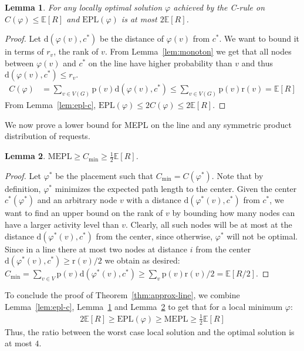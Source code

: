\documentclass[conference]{IEEEtran}
\def\E{\mathbb{E}}
\def\d{\mathrm{d}}
\def\p{\mathrm{p}}
\def\r{\mathrm{r}}
\def\epl{\mathrm{EPL}}
\def\mepl{\mathrm{MEPL}}
\newtheorem{lemma}{Lemma}
\begin{document}
\begin{lemma}\label{lemma:upper_bound_line}
For any locally optimal solution $\varphi$ achieved by the C-rule on $C(\varphi) \le \E[R]$ and $\epl(\varphi)$ is at most $2\E[R]$.
\end{lemma}
\begin{proof}
Let $\d(\varphi(v),c^*)$ be the distance of $\varphi(v)$ from $c^*$. We want to bound it in terms of $r_v$, the rank of $v$.
From Lemma~\ref{lem:monoton} we get that all nodes between $\varphi(v)$ and $c^*$ on the line have higher probability than $v$ and thus $\d(\varphi(v),c^*) \le r_v$.
\begin{align*}
C(\varphi)&=\sum_{v\in V(G)}\p(v)\d(\varphi(v),c^*)\le \sum_{v \in V(G)} \p(v) \r(v)=\E[R]
\end{align*}
From Lemma~\ref{lem:epl-c}, $\epl(\varphi) \le 2C(\varphi) \le 2\E[R]$.
\end{proof}
We now prove a lower bound for MEPL on the line and any symmetric product distribution of requests.
\begin{lemma}\label{lem:1-D-lower}
$\mepl \ge C_{\min} \ge \frac{1}{2}\E[R]$.
\end{lemma}
\begin{proof}
Let $\varphi^*$ be the placement  such that $C_{\min} = C(\varphi^*)$. Note that by definition, $\varphi^*$ minimizes the expected path length to the center. Given the center $c^*(\varphi^*)$ and an arbitrary node $v$ with a distance $\d(\varphi^*(v),c^*)$ from $c^*$, we want to find an upper bound on the rank of $v$ by bounding how many nodes can have a larger activity level than $v$. Clearly, all such nodes will be at most at the distance $\d(\varphi^*(v),c^*)$ from the center, since otherwise, $\varphi^*$ will not be optimal.
Since in a line there at most two nodes at distance $i$ from the center $\d(\varphi^*(v),c^*) \ge \r(v)/2$ we obtain as desired: $C_{\min}=\sum_{v\in V}\p(v)\d(\varphi^*(v),c^*)\ge\sum_{v}\p(v) \r(v)/2=\E[R/2]$.
\end{proof}

To conclude the proof of Theorem~\ref{thm:approx-line}, we combine Lemma~\ref{lem:epl-c}, Lemma~\ref{lemma:upper_bound_line} and Lemma~\ref{lem:1-D-lower} to get that for a local minimum $\varphi$:
\begin{align}
2\E[R] \ge \epl(\varphi) \ge \mepl \ge \frac{1}{2}\E[R]
\end{align}
Thus, the ratio between the worst case local solution and the optimal solution is at most $4$.  
\end{document}
